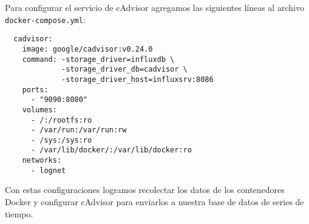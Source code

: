 Para configurar el servicio de cAdvisor agregamos las siguientes líneas al archivo \lstinline{docker-compose.yml}:

\begin{lstlisting}
  cadvisor:
    image: google/cadvisor:v0.24.0
    command: -storage_driver=influxdb \
             -storage_driver_db=cadvisor \
             -storage_driver_host=influxsrv:8086
    ports:
      - "9090:8080"
    volumes:
      - /:/rootfs:ro
      - /var/run:/var/run:rw
      - /sys:/sys:ro
      - /var/lib/docker/:/var/lib/docker:ro
    networks:
      - lognet
\end{lstlisting}

Con estas configuraciones logramos recolectar los datos de los contenedores Docker y configurar cAdvisor para enviarlos a nuestra base de datos de series de tiempo.
